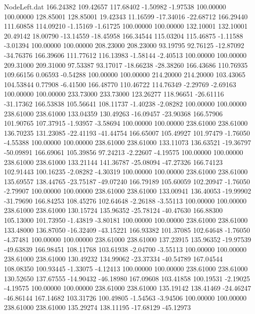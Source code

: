\begin{filecontents}{NodeLeft.dat}
 166.24382  109.42657  117.68402    -1.50982   -1.97538  100.00000  100.00000  128.85001  128.85001   19.42343   11.16599  -17.34016  -22.68712
 166.29440  111.60858  114.09210    -1.15169   -1.61725  100.00000  100.00000  132.10001  132.10001   20.49142   18.00790  -13.14559  -18.45958
 166.34544  115.03204  115.46875    -1.11588   -3.01394  100.00000  100.00000  208.23000  208.23000   93.19795   92.76125  -12.87092  -34.76376
 166.39606  111.77612  116.13983    -1.58144   -2.40513  100.00000  100.00000  209.31000  209.31000   97.53387   93.17017  -18.66238  -28.38260
 166.43686  110.76935  109.66156     0.06593   -0.54288  100.00000  100.00000  214.20000  214.20000  103.43065  104.53844    0.77908   -6.41500
 166.48770  110.46722  114.76349    -2.29769   -2.69163  100.00000  100.00000  233.73000  233.73000  123.26277  118.96651  -26.61116  -31.17362
 166.53838  105.56641  108.11737    -1.40238   -2.08282  100.00000  100.00000  238.61000  238.61000  133.04359  130.49263  -16.09457  -23.90368
 166.57906  101.90765  107.37915    -1.93957   -3.58694  100.00000  100.00000  238.61000  238.61000  136.70235  131.23085  -22.41193  -41.44754
 166.65007  105.49927  101.97479    -1.76050   -4.55388  100.00000  100.00000  238.61000  238.61000  133.11073  136.63521  -19.36797  -50.09891
 166.69061  105.39856   97.24213    -2.22607   -4.19575  100.00000  100.00000  238.61000  238.61000  133.21144  141.36787  -25.08094  -47.27326
 166.74123  102.91443  100.16235    -2.08282   -4.30319  100.00000  100.00000  238.61000  238.61000  135.69557  138.44765  -23.75187  -49.07240
 166.79189  105.60059  102.20947    -1.76050   -2.79907  100.00000  100.00000  238.61000  238.61000  133.00941  136.40053  -19.99902  -31.79690
 166.84253  108.45276  102.64648    -2.26188   -3.55113  100.00000  100.00000  238.61000  238.61000  130.15724  135.96352  -25.78124  -40.47630
 166.88300  105.13000  101.73950    -1.43819   -3.80181  100.00000  100.00000  238.61000  238.61000  133.48000  136.87050  -16.32409  -43.15221
 166.93382  101.37085  102.64648    -1.76050   -4.37481  100.00000  100.00000  238.61000  238.61000  137.23915  135.96352  -19.97539  -49.63839
 166.98451  108.11768  103.61938    -2.04700   -3.55113  100.00000  100.00000  238.61000  238.61000  130.49232  134.99062  -23.37334  -40.54789
 167.04544  108.08350  100.93445    -1.33075   -4.12413  100.00000  100.00000  238.61000  238.61000  130.52650  137.67555  -14.90432  -46.18980
 167.09608  103.41858  100.19531    -2.19025   -4.19575  100.00000  100.00000  238.61000  238.61000  135.19142  138.41469  -24.46247  -46.86144
 167.14682  103.31726  100.49805    -1.54563   -3.94506  100.00000  100.00000  238.61000  238.61000  135.29274  138.11195  -17.68129  -45.12973

\end{filecontents}
